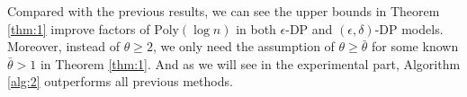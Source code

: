 \documentclass[12pt]{alt2022} %
\renewcommand{\tilde}{\widetilde}
\begin{document}
\begin{remark}\label{remark1}
Compared with the previous results, we can see the upper bounds in Theorem \ref{thm:1} improve factors of $\text{Poly}(\log n)$ in both $\epsilon$-DP and $(\epsilon, \delta)$-DP models. Moreover, instead of $\theta\geq 2$, we only need the assumption of $\theta\geq \bar{\theta}$ for some known $\bar{\theta}>1$ in  Theorem \ref{thm:1}. And as we will see in the experimental part, Algorithm \ref{alg:2} outperforms all previous methods. 
\end{remark}
\end{document}
